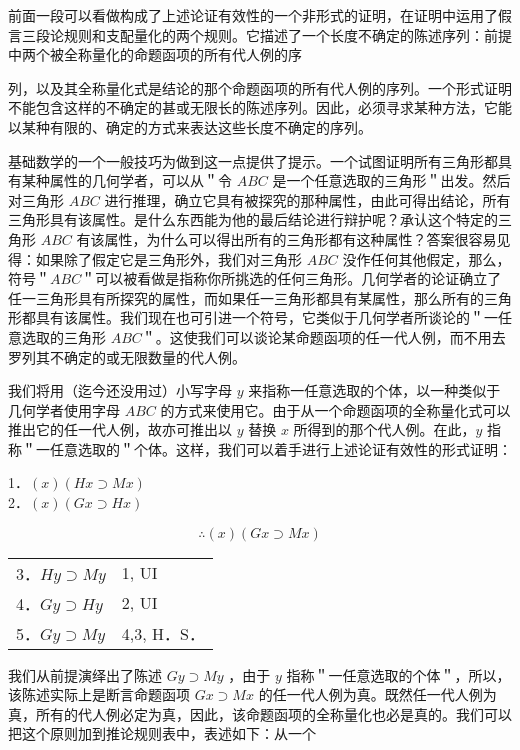 前面一段可以看做构成了上述论证有效性的一个非形式的证明，在证明中运用了假言三段论规则和支配量化的两个规则。它描述了一个长度不确定的陈述序列：前提中两个被全称量化的命题函项的所有代人例的序

列，以及其全称量化式是结论的那个命题函项的所有代人例的序列。一个形式证明不能包含这样的不确定的甚或无限长的陈述序列。因此，必须寻求某种方法，它能以某种有限的、确定的方式来表达这些长度不确定的序列。

基础数学的一个一般技巧为做到这一点提供了提示。一个试图证明所有三角形都具有某种属性的几何学者，可以从＂令 $A B C$ 是一个任意选取的三角形＂出发。然后对三角形 $A B C$ 进行推理，确立它具有被探究的那种属性，由此可得出结论，所有三角形具有该属性。是什么东西能为他的最后结论进行辩护呢？承认这个特定的三角形 $A B C$ 有该属性，为什么可以得出所有的三角形都有这种属性？答案很容易见得：如果除了假定它是三角形外，我们对三角形 $A B C$ 没作任何其他假定，那么，符号＂$A B C$＂可以被看做是指称你所挑选的任何三角形。几何学者的论证确立了任一三角形具有所探究的属性，而如果任一三角形都具有某属性，那么所有的三角形都具有该属性。我们现在也可引进一个符号，它类似于几何学者所谈论的＂一任意选取的三角形 $A B C$＂。这使我们可以谈论某命题函项的任一代人例，而不用去罗列其不确定的或无限数量的代人例。

我们将用（迄今还没用过）小写字母 $y$ 来指称一任意选取的个体，以一种类似于几何学者使用字母 $A B C$ 的方式来使用它。由于从一个命题函项的全称量化式可以推出它的任一代人例，故亦可推出以 $y$ 替换 $x$ 所得到的那个代人例。在此，$y$ 指称＂一任意选取的＂个体。这样，我们可以着手进行上述论证有效性的形式证明：

1．$(x)(H x \supset M x)$\\
2．$(x)(G x \supset H x)$

$$
\therefore(x)(G x \supset M x)
$$

\begin{center}
\begin{tabular}{ll}
3．$H y \supset M y$ & 1, UI \\
4．$G y \supset H y$ & 2, UI \\
5．$G y \supset M y$ & 4,3, H．S． \\
\end{tabular}
\end{center}

我们从前提演绎出了陈述 $G y \supset M y$ ，由于 $y$ 指称＂一任意选取的个体＂，所以，该陈述实际上是断言命题函项 $G x \supset M x$ 的任一代人例为真。既然任一代人例为真，所有的代人例必定为真，因此，该命题函项的全称量化也必是真的。我们可以把这个原则加到推论规则表中，表述如下：从一个

